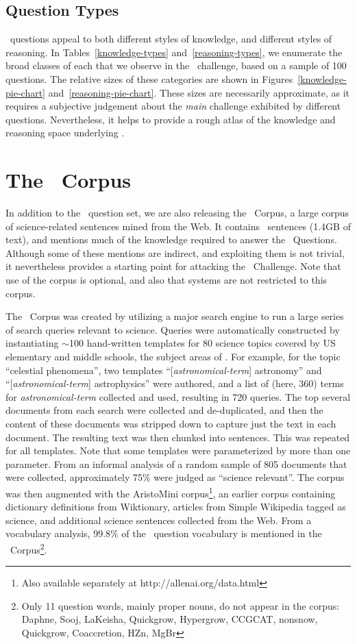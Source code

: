 \subsection{Question Types}

\ASC~questions appeal to both different styles of knowledge, and different styles of reasoning. In Tables~\ref{knowledge-types} and~\ref{reasoning-types}, we enumerate the broad classes of each that we observe in the \ASC~challenge, based on a sample of 100 questions. The relative sizes of these categories are shown in Figures~\ref{knowledge-pie-chart} and~\ref{reasoning-pie-chart}.
These sizes are necessarily approximate, as it requires a subjective judgement about the {\it main} challenge exhibited by different questions. Nevertheless, it helps to provide a rough atlas of the knowledge and reasoning space underlying \ASC.

\section{The \ASC~Corpus}

In addition to the \ASC~question set, we are also releasing the \ASC~Corpus, a large corpus of science-related sentences mined from the Web. It contains ~sentences (1.4GB of text), and mentions much of the knowledge required to answer the \Challenge~Questions. Although some of these mentions are indirect, and exploiting them is not trivial, it nevertheless provides a starting point for attacking the \ASC~Challenge.
Note that use of the corpus is optional, and also that systems are not restricted to this corpus.

The \ASC~Corpus was created by utilizing a major search engine to run a large series of search queries relevant to science. Queries were automatically constructed by instantiating $\sim$100 hand-written templates for 80 science topics covered by US elementary and middle schools, the subject areas of \ASC. For example, for the topic ``celestial phenomena'', two templates ``[{\it astronomical-term}] astronomy'' and
``[{\it astronomical-term}] astrophysics'' were authored, and a list of (here, 360) terms for {\it astronomical-term} collected and used, resulting in 720 queries. The top several documents from each search were collected and de-duplicated, and then the content of these documents was stripped down to capture just the text in each document. The resulting text was then chunked into sentences. This was repeated for all templates. Note that some templates were parameterized by more than one parameter. From an informal analysis of a random sample of 805 documents that were collected, approximately 75\% were judged as ``science relevant''. The corpus was then augmented with the AristoMini corpus\footnote{Also available separately at http://allenai.org/data.html}, an earlier corpus containing dictionary definitions from Wiktionary, articles from Simple Wikipedia tagged as science, and additional science sentences collected from the Web. From a vocabulary analysis, 99.8\% of the \ASC~question vocabulary is mentioned in the \ASC~Corpus\footnote{
  Only 11 question words, mainly proper nouns, do not appear in the corpus: Daphne, Sooj, LaKeisha, Quickgrow, Hypergrow, CCGCAT, nonsnow, Quickgrow, Coaccretion, HZn, MgBr}.

